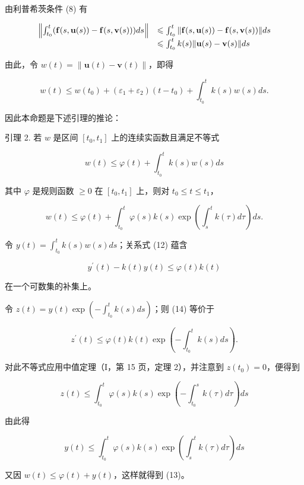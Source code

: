 由利普希茨条件 (8) 有

\[
\begin{array}{r l} \left\| \int_ {t _ {0}} ^ {t} (\mathbf {f} (s, \mathbf {u} (s)) - \mathbf {f} (s, \mathbf {v} (s))) d s \right\| & \leqslant \int_ {t _ {0}} ^ {t} \| \mathbf {f} (s, \mathbf {u} (s)) - \mathbf {f} (s, \mathbf {v} (s)) \| d s \\ & \leqslant \int_ {t _ {0}} ^ {t} k (s) \| \mathbf {u} (s) - \mathbf {v} (s) \| d s \end{array}
\]

由此，令 \(w(t) = \|\mathbf{u}(t) - \mathbf{v}(t)\|\)，即得

\[
w (t) \leqslant w \left(t _ {0}\right) + \left(\varepsilon_ {1} + \varepsilon_ {2}\right) \left(t - t _ {0}\right) + \int_ {t _ {0}} ^ {t} k (s) w (s) d s.\tag{11}
\]

因此本命题是下述引理的推论：

引理 2. 若 \(w\) 是区间 \([t_0, t_1]\) 上的连续实函数且满足不等式

\[
w (t) \leqslant \varphi (t) + \int_ {t _ {0}} ^ {t} k (s) w (s) d s\tag{12}
\]

其中 \(\varphi\) 是规则函数 \(\geqslant 0\) 在 \([t_0, t_1]\) 上，则对 \(t_0 \leqslant t \leqslant t_1\)，

\[
w (t) \leqslant \varphi (t) + \int_ {t _ {0}} ^ {t} \varphi (s) k (s) \exp \left(\int_ {s} ^ {t} k (\tau) d \tau\right) d s.\tag{13}
\]

令 \(y(t) = \int_{t_0}^{t} k(s)w(s)ds\)；关系式 (12) 蕴含

\[
y ^ {\prime} (t) - k (t) y (t) \leqslant \varphi (t) k (t)\tag{14}
\]

在一个可数集的补集上。

令 \(z(t) = y(t)\exp \left(-\int_{t_0}^t k(s)ds\right)\)；则 (14) 等价于

\[
z ^ {\prime} (t) \leqslant \varphi (t) k (t) \exp \left(- \int_ {t _ {0}} ^ {t} k (s) d s\right).
\]

对此不等式应用中值定理（I，第 15 页，定理 2），并注意到 \(z(t_0) = 0\)，便得到

\[
z (t) \leqslant \int_ {t _ {0}} ^ {t} \varphi (s) k (s) \exp \left(- \int_ {t _ {0}} ^ {s} k (\tau) d \tau\right) d s
\]

由此得

\[
y (t) \leqslant \int_ {t _ {0}} ^ {t} \varphi (s) k (s) \exp \left(\int_ {s} ^ {t} k (\tau) d \tau\right) d s
\]

又因 \(w(t) \leqslant \varphi(t) + y(t)\)，这样就得到 (13)。

